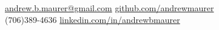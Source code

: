 \documentclass[10pt]{article}
\begin{document}

\sloppy  %



\spacedhrule{0.9em}{-0.4em}  %

\vspace{0.3in}
\noindent
\href{mailto:andrew.b.maurer@gmail.com}{{andrew.b.maurer@gmail.com}} \tabto{9.4cm} \href{http://github.com/andrewmaurer}{{github.com/andrewmaurer}} \\
(706)389-4636 \tabto{9.4cm} \href{https://linkedin.com/in/andrewbmaurer}{{linkedin.com/in/andrewbmaurer}} \\
~ \tabto{9.4cm} ~
\end{document}
